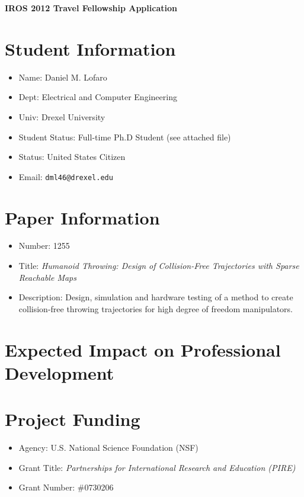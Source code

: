 \documentclass[11pt,a4paper,oneside]{report}
\begin{document}
\begin{center}
\LARGE{ \bf IROS 2012 Travel Fellowship Application }
\end{center}

\section*{Student Information}
\begin{itemize}
\item Name: Daniel M. Lofaro
\item Dept: Electrical and Computer Engineering
\item Univ: Drexel University
\item Student Status: Full-time Ph.D Student (see attached file)
\item Status: United States Citizen
\item Email: \tt{dml46@drexel.edu}
\end{itemize}


\section*{Paper Information}
\begin{itemize}
\item Number: 1255
\item Title: \textit{Humanoid Throwing: Design of Collision-Free Trajectories with Sparse Reachable Maps}
\item Description: Design, simulation and hardware testing of a method to create collision-free throwing trajectories for high degree of freedom manipulators. 
\end{itemize}


\section*{Expected Impact on Professional Development}




\section*{Project Funding}
\begin{itemize}
\item Agency: U.S. National Science Foundation (NSF)
\item Grant Title: \textit{Partnerships for International Research
and Education (PIRE)}
\item Grant Number: \#0730206
\end{itemize}
\end{document}
